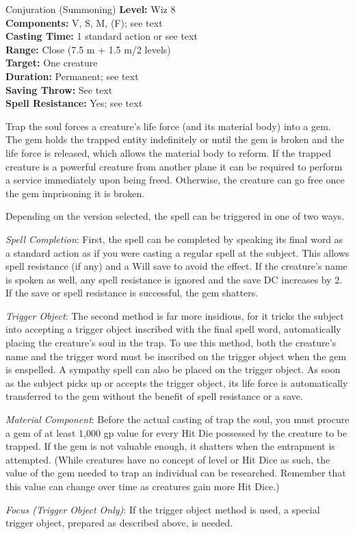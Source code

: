 {Conjuration (Summoning)}
{
	\textbf{Level:}
	Wiz 8\\
	\textbf{Components:}
	V, S, M, (F); see text\\
	\textbf{Casting Time:}
	1 standard action or see text\\
	\textbf{Range:}
	Close (7.5 m + 1.5 m/2 levels)\\
	\textbf{Target:}
	One creature\\
	\textbf{Duration:}
	Permanent; see text\\
	\textbf{Saving Throw:}
	See text\\
	\textbf{Spell Resistance:}
	Yes; see text\\
}
{
	Trap the soul forces a creature's life force (and its material body) into a gem. The gem holds the trapped entity indefinitely or until the gem is broken and the life force is released, which allows the material body to reform. If the trapped creature is a powerful creature from another plane it can be required to perform a service immediately upon being freed. Otherwise, the creature can go free once the gem imprisoning it is broken.

	Depending on the version selected, the spell can be triggered in one of two ways.

	\textit{Spell Completion}:
	First, the spell can be completed by speaking its final word as a standard action as if you were casting a regular spell at the subject. This allows spell resistance (if any) and a Will save to avoid the effect. If the creature's name is spoken as well, any spell resistance is ignored and the save DC increases by 2. If the save or spell resistance is successful, the gem shatters.

	\textit{Trigger Object}:
	The second method is far more insidious, for it tricks the subject into accepting a trigger object inscribed with the final spell word, automatically placing the creature's soul in the trap. To use this method, both the creature's name and the trigger word must be inscribed on the trigger object when the gem is enspelled. A sympathy spell can also be placed on the trigger object. As soon as the subject picks up or accepts the trigger object, its life force is automatically transferred to the gem without the benefit of spell resistance or a save.

	\textit{Material Component}:
	Before the actual casting of trap the soul, you must procure a gem of at least 1,000 gp value for every Hit Die possessed by the creature to be trapped. If the gem is not valuable enough, it shatters when the entrapment is attempted. (While creatures have no concept of level or Hit Dice as such, the value of the gem needed to trap an individual can be researched. Remember that this value can change over time as creatures gain more Hit Dice.)

	\textit{Focus (Trigger Object Only)}:
	If the trigger object method is used, a special trigger object, prepared as described above, is needed.

}
